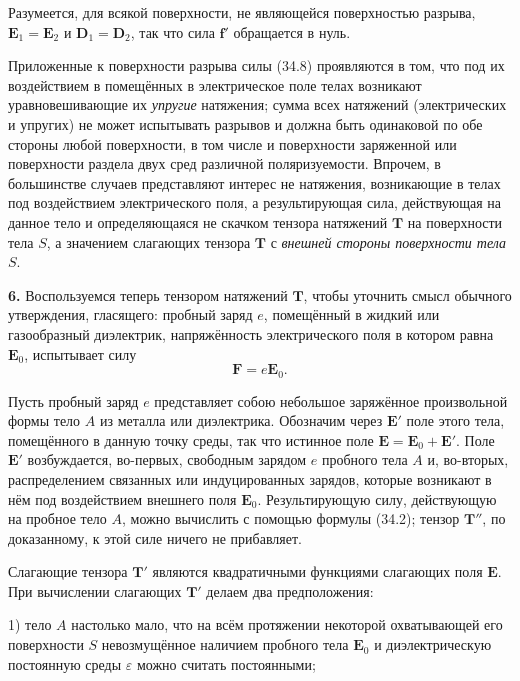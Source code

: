 \documentclass[a4paper,12pt]{article}
\begin{document}
Разумеется, для всякой поверхности, не являющейся поверхностью разрыва,
$\mathbf{E}_1 = \mathbf{E}_2$ и $\mathbf{D}_1 = \mathbf{D}_2$, так что
сила $\mathbf{f}'$ обращается в нуль.

Приложенные к поверхности разрыва силы (34.8) проявляются в том, что
под их воздействием в помещённых в электрическое поле телах возникают
уравновешивающие их \textit{упругие} натяжения; сумма всех натяжений
(электрических и упругих) не может испытывать разрывов и должна быть
одинаковой по обе стороны любой поверхности, в том числе и поверхности
заряженной или поверхности раздела двух сред различной поляризуемости.
Впрочем, в большинстве случаев представляют интерес не натяжения,
возникающие в телах под воздействием электрического поля, а
результирующая сила, действующая на данное тело и определяющаяся не
скачком тензора натяжений $\mathbf{T}$ на поверхности тела $S$, а
значением слагающих тензора $\mathbf{T}$ с \textit{внешней стороны
поверхности тела} $S$.

\textbf{6.} Воспользуемся теперь тензором натяжений $\mathbf{T}$, чтобы
уточнить смысл обычного утверждения, гласящего: пробный заряд $e$,
помещённый в жидкий или газообразный диэлектрик, напряжённость
электрического поля в котором равна $\mathbf{E}_0$, испытывает силу
\begin{equation}
    \mathbf{F} = e\mathbf{E}_0.
    \tag{34.9}
\end{equation}

Пусть пробный заряд $e$ представляет собою небольшое заряжённое
произвольной формы тело $A$ из металла или диэлектрика. Обозначим через
$\mathbf{E}'$ поле этого тела, помещённого в данную точку среды, так
что истинное поле $\mathbf{E} = \mathbf{E}_0 + \mathbf{E}'$. Поле
$\mathbf{E}'$ возбуждается, во-первых, свободным зарядом $e$ пробного
тела $A$ и, во-вторых, распределением связанных или индуцированных
зарядов, которые возникают в нём под воздействием внешнего поля
$\mathbf{E}_0$. Результирующую силу, действующую на пробное тело $A$,
можно вычислить с помощью формулы (34.2); тензор $\mathbf{T}''$, по
доказанному, к этой силе ничего не прибавляет.

Слагающие тензора $\mathbf{T}'$ являются квадратичными функциями
слагающих поля $\mathbf{E}$. При вычислении слагающих $\mathbf{T}'$
делаем два предположения:

1) тело $A$ настолько мало, что на всём протяжении некоторой
охватывающей его поверхности $S$ невозмущённое наличием пробного тела
$\mathbf{E}_0$ и диэлектрическую постоянную среды $\varepsilon$ можно
считать постоянными;
\end{document}
